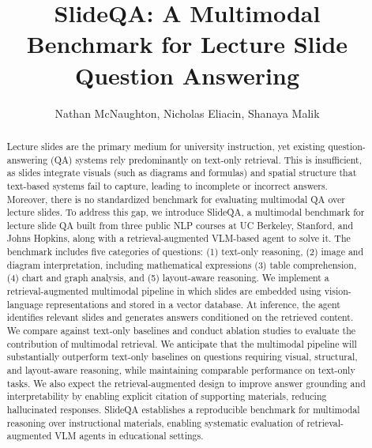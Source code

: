 \documentclass{article} %
\title{SlideQA: A Multimodal Benchmark for Lecture Slide Question Answering}
\author{Nathan McNaughton, Nicholas Eliacin, Shanaya Malik}
\begin{document}
\maketitle

\begin{abstract}
Lecture slides are the primary medium for university instruction, yet existing question-answering (QA) systems rely predominantly on text-only retrieval. This is insufficient, as slides integrate visuals (such as diagrams and formulas) and spatial structure that text-based systems fail to capture, leading to incomplete or incorrect answers. Moreover, there is no standardized benchmark for evaluating multimodal QA over lecture slides. To address this gap, we introduce SlideQA, a multimodal benchmark for lecture slide QA built from three public NLP courses at UC Berkeley, Stanford, and Johns Hopkins, along with a retrieval-augmented VLM-based agent to solve it. The benchmark includes five categories of questions: (1) text-only reasoning, (2) image and diagram interpretation, including mathematical expressions (3) table comprehension, (4) chart and graph analysis, and (5) layout-aware reasoning. We implement a retrieval-augmented multimodal pipeline in which slides are embedded using vision-language representations and stored in a vector database. At inference, the agent identifies relevant slides and generates answers conditioned on the retrieved content. We compare against text-only baselines and conduct ablation studies to evaluate the contribution of multimodal retrieval. We anticipate that the multimodal pipeline will substantially outperform text-only baselines on questions requiring visual, structural, and layout-aware reasoning, while maintaining comparable performance on text-only tasks.  We also expect the retrieval-augmented design to improve answer grounding and interpretability by enabling explicit citation of supporting materials, reducing hallucinated responses. SlideQA establishes a reproducible benchmark for multimodal reasoning over instructional materials, enabling systematic evaluation of retrieval-augmented VLM agents in educational settings.  
\end{abstract}
\end{document}
